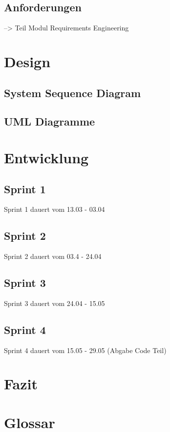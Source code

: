 \documentclass[a4paper,parskip]{scrartcl}
\begin{document}
\subsection{Anforderungen}
--> Teil Modul Requirements Engineering

\section{Design}

\subsection{System Sequence Diagram}

\subsection{UML Diagramme}

\section{Entwicklung}
\subsection{Sprint 1}
Sprint 1 dauert vom 13.03 - 03.04
\subsection{Sprint 2}
Sprint 2 dauert vom 03.4 - 24.04
\subsection{Sprint 3}
Sprint 3 dauert vom 24.04 - 15.05
\subsection{Sprint 4}
Sprint 4 dauert vom 15.05 - 29.05 (Abgabe Code Teil)
\section{Fazit}

\section{Glossar}
\end{document}
